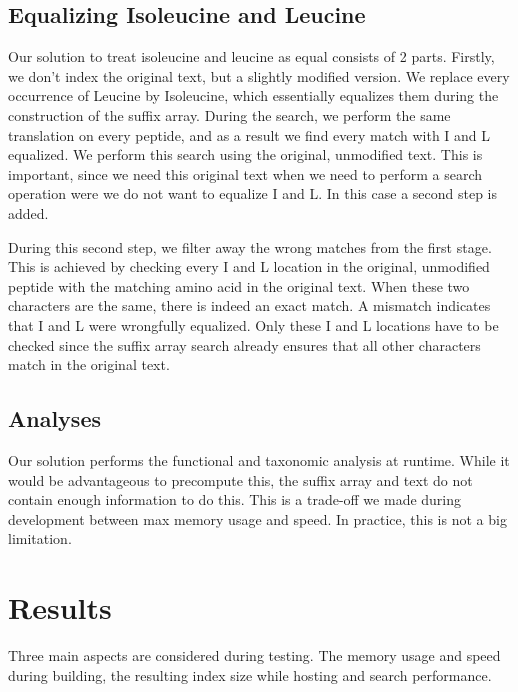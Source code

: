 \documentclass[11pt]{article}
\begin{document}
\begin{multicols}{2}
        \subsection{Equalizing Isoleucine and Leucine}
        Our solution to treat isoleucine and leucine as equal consists of 2 parts.
        Firstly, we don't index the original text, but a slightly modified version.
        We replace every occurrence of Leucine by Isoleucine, which essentially equalizes them during the construction of the suffix array.
        During the search, we perform the same translation on every peptide, and as a result we find every match with I and L equalized.
        We perform this search using the original, unmodified text.
        This is important, since we need this original text when we need to perform a search operation were we do not want to equalize I and L\@.
        In this case a second step is added.

        During this second step, we filter away the wrong matches from the first stage.
        This is achieved by checking every I and L location in the original, unmodified peptide with the matching amino acid in the original text.
        When these two characters are the same, there is indeed an exact match.
        A mismatch indicates that I and L were wrongfully equalized.
        Only these I and L locations have to be checked since the suffix array search already ensures that all other characters match in the original text.

        \subsection{Analyses}
        Our solution performs the functional and taxonomic analysis at runtime.
        While it would be advantageous to precompute this, the suffix array and text do not contain enough information to do this.
        This is a trade-off we made during development between max memory usage and speed.
        In practice, this is not a big limitation.

        \section{Results}\label{sec:results}
        Three main aspects are considered during testing.
        The memory usage and speed during building, the resulting index size while hosting and search performance.


\end{multicols}
\end{document}
